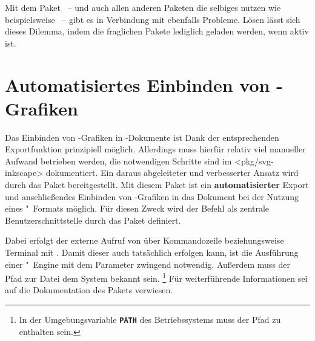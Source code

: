 
Mit dem Paket ~-- und auch allen anderen Paketen die 
selbiges nutzen wie beispielsweise ~-- gibt es in Verbindung 
mit  ebenfalls Probleme. Lösen lässt sich dieses Dilemma, 
indem die fraglichen Pakete lediglich geladen werden, wenn  
aktiv ist.
%
\begin{quoting}[rightmargin=0pt]
\begin{Code}
\ifpdf
  \usepackage{tikz}%
\fi
\end{Code}
\end{quoting}



\section{%
  Automatisiertes Einbinden von -Grafiken%
  \label{sec:tips:svg}%
}

%
Das Einbinden von -Grafiken in -Dokumente
ist Dank der entsprechenden Exportfunktion prinzipiell möglich. Allerdings muss 
hierfür relativ viel manueller Aufwand betrieben werden, die notwendigen 
Schritte sind im \CTAN<pkg/svg-inkscape> dokumentiert. Ein daraus 
abgeleiteter und verbesserter Ansatz wird durch das Paket  
bereitgestellt. Mit diesem Paket ist ein \textbf{automatisierter} Export und 
anschließendes Einbinden von -Grafiken in das Dokument 
bei der Nutzung eines "~Formats möglich. Für diesen Zweck wird 
der Befehl  als 
zentrale Benutzerschnittstelle durch das Paket definiert.

Dabei erfolgt der externe Aufruf von  über Kommandozeile 
beziehungsweise Terminal mit . Damit dieser auch tatsächlich 
erfolgen kann, ist die Ausführung einer "~Engine mit dem
Parameter  zwingend notwendig. Außerdem muss der 
Pfad zur Datei  dem System bekannt sein.%
\footnote{%
  In der Umgebungsvariable \textbf{\texttt{PATH}} des Betriebssystems muss der 
  Pfad zu  enthalten sein.%
}
Für weiterführende Informationen sei auf die Dokumentation des Pakets 
 verwiesen.



